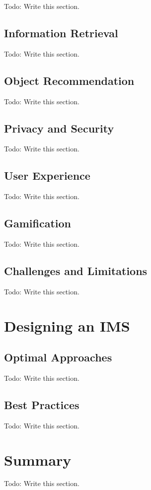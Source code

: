 Todo: Write this section.

\subsection{Information Retrieval}

Todo: Write this section.

\subsection{Object Recommendation}

Todo: Write this section.

\subsection{Privacy and Security}

Todo: Write this section.

\subsection{User Experience}

Todo: Write this section.

\subsection{Gamification}

Todo: Write this section.

\subsection{Challenges and Limitations}

Todo: Write this section.

\section{Designing an IMS}

\subsection{Optimal Approaches}

Todo: Write this section.

\subsection{Best Practices}

Todo: Write this section.

\section{Summary}

Todo: Write this section.